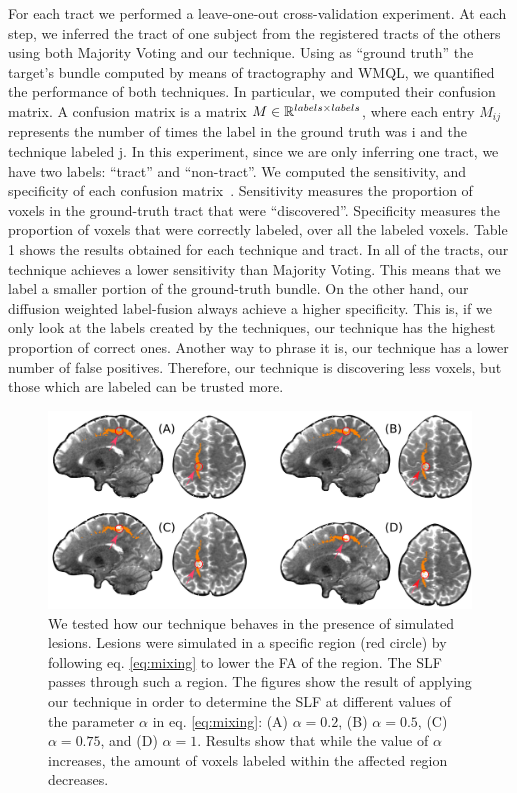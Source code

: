 For each tract we performed a leave-one-out cross-validation experiment. At each step, we
inferred the tract of one subject from the registered tracts of the others
using both Majority Voting and our technique. Using as ``ground truth'' the
target's bundle computed by means of tractography and WMQL, we quantified the
performance of both techniques. In particular, we computed their confusion matrix.
A confusion matrix is a matrix $M \in \mathbb{R}^{labels \times labels}$, where each entry $M_{ij}$
represents the number of times the label in the ground truth was i and the
technique labeled j. In this experiment, since we are only inferring one tract, we have
two labels: ``tract'' and ``non-tract''. We computed the sensitivity, and specificity of
each confusion matrix~\cite{Kuhn2013}. Sensitivity measures the proportion of voxels
in the ground-truth tract that were ``discovered''. Specificity measures the proportion
of voxels that were correctly labeled, over all the labeled voxels. Table 1 shows
the results obtained for each technique and tract. In all of the tracts, our
technique achieves a lower sensitivity than Majority Voting. This means that
we label a smaller portion of the ground-truth bundle. On the other hand,
our diffusion weighted label-fusion always achieve a higher specificity. This
is, if we only look at the labels created by the techniques, our technique
has the highest proportion of correct ones. Another way to phrase it is, our
technique has a lower number of false positives.
Therefore, our technique is discovering less voxels, but those which are labeled
can be trusted more.

\begin{figure}[t]
    \includegraphics[width=\textwidth]{7.multiatlas/img/pathology.png}
    \caption{We tested how our technique behaves in the presence of simulated lesions.
             Lesions were simulated in a specific region (red circle) by following
             eq. \ref{eq:mixing} to lower the FA of the region. The SLF passes through
             such a region. The figures show the result of applying our technique 
             in order to determine the SLF at different values of the parameter $\alpha$ in
             eq. \ref{eq:mixing}: (A) $\alpha=0.2$, (B) $\alpha=0.5$, (C) $\alpha=0.75$, and (D) $\alpha=1$.
             Results show that while the value of $\alpha$ increases, the amount of voxels
             labeled within the affected region decreases.}
    \label{fig:labeling}
\end{figure}

